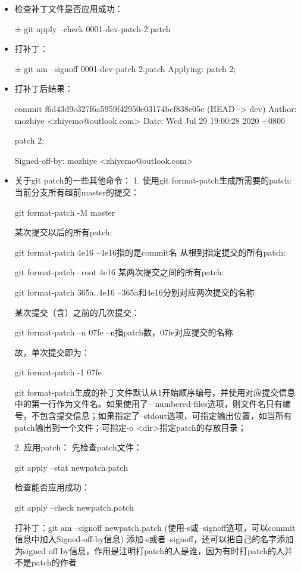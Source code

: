 \begin{itemize}
\item 检查补丁文件是否应用成功：
\begin{commandbox}
± git apply --check 0001-dev-patch-2.patch
\end{commandbox}

\item 打补丁：
\begin{commandbox}
± git am --signoff 0001-dev-patch-2.patch 
Applying: patch 2;
\end{commandbox}

\item 打补丁后结果：
\begin{messagebox}
commit f6d43d9c327f6a5959f42950e03174bcf838c05e (HEAD -> dev)
Author: mozhiye <zhiyemo@outlook.com>
Date:   Wed Jul 29 19:00:28 2020 +0800

    patch 2;
    
    Signed-off-by: mozhiye <zhiyemo@outlook.com>
\end{messagebox}

\item 关于git patch的一些其他命令：
1. 使用git format-patch生成所需要的patch:
当前分支所有超前master的提交：
\begin{messagebox}
git format-patch -M master
\end{messagebox}

某次提交以后的所有patch:
\begin{messagebox}
git format-patch 4e16                --4e16指的是commit名
从根到指定提交的所有patch:
\end{messagebox}
git format-patch                          --root 4e16
某两次提交之间的所有patch:
\begin{messagebox}
git format-patch 365a..4e16      --365a和4e16分别对应两次提交的名称
\end{messagebox}
某次提交（含）之前的几次提交：
\begin{messagebox}
git format-patch –n 07fe             --n指patch数，07fe对应提交的名称
\end{messagebox}
故，单次提交即为：
\begin{messagebox}
git format-patch -1 07fe
\end{messagebox}
git format-patch生成的补丁文件默认从1开始顺序编号，并使用对应提交信息中的第一行作为文件名。如果使用了-- numbered-files选项，则文件名只有编号，不包含提交信息；如果指定了--stdout选项，可指定输出位置，如当所有patch输出到一个文件；可指定-o <dir>指定patch的存放目录；
 
2. 应用patch：
先检查patch文件：
\begin{messagebox}
git apply --stat newpatch.patch
\end{messagebox}
检查能否应用成功：
\begin{messagebox}
git apply --check  newpatch.patch
\end{messagebox}
打补丁：git am --signoff newpatch.patch
(使用-s或--signoff选项，可以commit信息中加入Signed-off-by信息)
添加-s或者--signoff，还可以把自己的名字添加为signed off by信息，作用是注明打patch的人是谁，因为有时打patch的人并不是patch的作者


\end{itemize}
